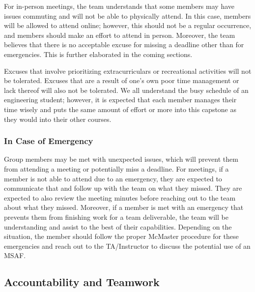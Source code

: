 \documentclass{article}
\begin{document}

For in-person meetings, the team understands that some members may have issues commuting and will not be able to physically attend. In this case, members will be allowed to attend online; however, this should not be a regular occurrence, and members should make an effort to attend in person. Moreover, the team believes that there is no acceptable excuse for missing a deadline other than for emergencies. This is further elaborated in the coming sections. 

Excuses that involve prioritizing extracurriculars or recreational activities will not be tolerated.
Excuses that are a result of one's own poor time management or lack thereof will also not be tolerated.
We all understand the busy schedule of an engineering student; however, it is expected that each member manages their time wisely and puts the same amount of effort or more into this capstone as they would into their other courses.



\subsubsection*{In Case of Emergency}


Group members may be met with unexpected issues, which will prevent them from attending a meeting or potentially miss a deadline. For meetings, if a member is not able to attend due to an emergency, they are expected to communicate that and follow up with the team on what they missed. They are expected to also review the meeting minutes before reaching out to the team about what they missed. Moreover, if a member is met with an emergency that prevents them from finishing work for a team deliverable, the team will be understanding and assist to the best of their capabilities. Depending on the situation, the member should follow the proper McMaster procedure for these emergencies and reach out to the TA/Instructor to discuss the potential use of an MSAF.

\subsection*{Accountability and Teamwork}
\end{document}
